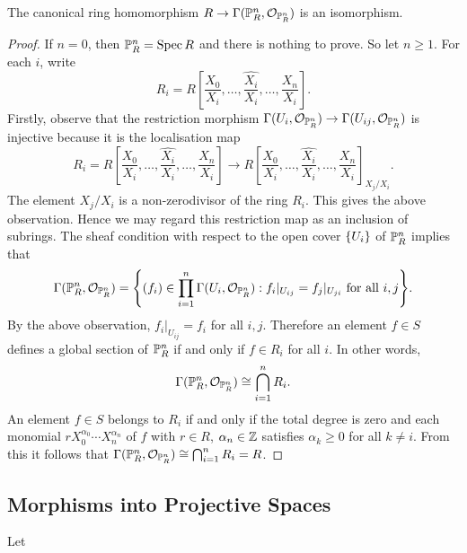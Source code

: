\begin{proposition}
	The canonical ring homomorphism $R \to \Gamma(\mathbb P^n_R, \mathcal{O}_{\mathbb P^n_R})$ is an isomorphism.
\end{proposition}
\begin{proof}
	If $n = 0$, then $\mathbb P^n_R = \operatorname{Spec} R$ and there is nothing to prove. So let $n \geq 1$. For each $i$, write
	\begin{equation*}
		R_i = R\left[\frac{X_0}{X_i}, \dotsc, \widehat{\frac{X_i}{X_i}}, \dotsc, \frac{X_n}{X_i}\right].
	\end{equation*}
	Firstly, observe that the restriction morphism $\Gamma(U_i, \mathcal{O}_{\mathbb P^n_R}) \to \Gamma(U_{ij}, \mathcal{O}_{\mathbb P^n_R})$ is injective because it is the localisation map
	\begin{equation*}
		R_i = R\left[\frac{X_0}{X_i}, \dotsc, \widehat{\frac{X_i}{X_i}}, \dotsc, \frac{X_n}{X_i}\right] \to R\left[\frac{X_0}{X_i}, \dotsc, \widehat{\frac{X_i}{X_i}}, \dotsc, \frac{X_n}{X_i}\right]_{X_j/X_i}.
	\end{equation*} 
	The element $X_j/X_i$ is a non-zerodivisor of the ring $R_i$. This gives the above observation. Hence we may regard this restriction map as an inclusion of subrings. The sheaf condition with respect to the open cover $\lbrace U_i\rbrace$ of $\mathbb P^n_R$ implies that
	\begin{equation*}
		\Gamma(\PP^n_R, \mathcal{O}_{\PP^n_R}) = \Set*{(f_i) \in \prod_{i = 1}^n \Gamma(U_i, \mathcal{O}_{\PP^n_R}) : f_i|_{U_{ij}} = f_j|_{U_{ji}} \text{ for all } i, j}.
	\end{equation*}
	By the above observation, $f_i|_{U_{ij}} = f_i$ for all $i, j$. Therefore an element $f \in S$ defines a global section of $\mathbb P^n_R$ if and only if $f \in R_i$ for all $i$. In other words,
	\begin{equation*}
		\Gamma(\mathbb P^n_R, \mathcal{O}_{\mathbb P^n_R}) \cong \bigcap_{i = 1}^n R_i. 
	\end{equation*}
	An element $f \in S$ belongs to $R_i$ if and only if the total degree is zero and each monomial $r X_0^{\alpha_0} \dotsb X_n^{\alpha_n}$ of $f$ with $r \in R$, $\alpha_n \in \mathbb Z$ satisfies $\alpha_k \geq 0$ for all $k \neq i$. From this it follows that $\Gamma(\mathbb P^n_R, \mathcal{O}_{\mathbb P^n_R}) \cong \bigcap_{i = 1}^n R_i = R$.
\end{proof}

\subsection*{Morphisms into Projective Spaces}
\begin{proposition}
	Let 
\end{proposition}


